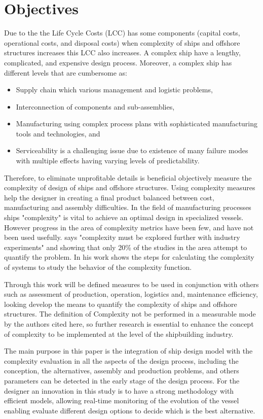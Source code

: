 \section{Objectives}
Due to the  the Life Cycle Costs (LCC) has some components (capital costs, operational costs, and disposal costs) when complexity of ships and offshore structures increases this LCC also increases. A complex ship have a lengthy, complicated, and expensive design process. Moreover, a complex ship has different levels that are cumbersome as:  
\begin{itemize}
\item Supply chain which various management and logistic problems, 
\item Interconnection of components and sub-assemblies,  
\item Manufacturing using complex process plans with sophisticated manufacturing tools and technologies, and
\item Serviceability is a challenging issue due to existence of many failure modes with multiple effects having varying levels of predictability.
\end{itemize}


Therefore, to eliminate unprofitable details is beneficial objectively measure the complexity of design of ships and offshore structures. Using complexity measures help the designer in creating a final product balanced between cost, manufacturing and assembly difficulties. In the field of manufacturing processes ships "complexity" is vital to achieve an optimal design in specialized vessels. However progress in the area of complexity metrics have been few, and have not been used usefully.  \cite{Tang01} says "complexity must be explored further with industry experiments" and showing that only 20\% of the studies in the area attempt to quantify the problem. In his work shows the steps for calculating the complexity of systems to study the behavior of the complexity function.


Through this work will be defined measures to be used in conjunction with others such as assessment of production, operation, logistics and, maintenance efficiency, looking develop the means to quantify the complexity of ships and offshore structures. The definition of Complexity not be performed in a measurable mode by the authors cited here, so further research is essential to enhance the concept of complexity to be implemented at the level of the shipbuilding industry.


The main purpose in this paper is the integration of  ship design model with the complexity evaluation in all the aspects of the  design process, including the  conception, the alternatives, assembly and production problems, and others parameters can be detected in the early stage of the design process. For the designer an innovation in this study is to have a strong methodology with efficient models, allowing real-time monitoring of the evolution of the vessel enabling evaluate different design options to decide which is the best alternative.
